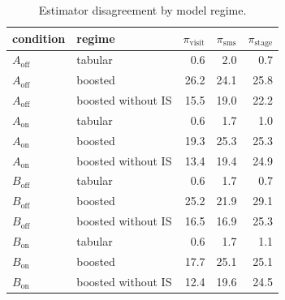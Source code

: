 \begin{table}[!htbp]
\centering
\caption{Estimator disagreement by model regime.}
\label{tab:campaignagreement}
\small
\begin{tabular}{llrrr}
\toprule
condition & regime & $\pi_{\mathrm{visit}}$ & $\pi_{\mathrm{sms}}$ & $\pi_{\mathrm{stage}}$ \\
\midrule
$A_{\mathrm{off}}$ & tabular & 0.6 & 2.0 & 0.7 \\
$A_{\mathrm{off}}$ & boosted & 26.2 & 24.1 & 25.8 \\
$A_{\mathrm{off}}$ & boosted without IS & 15.5 & 19.0 & 22.2 \\
$A_{\mathrm{on}}$ & tabular & 0.6 & 1.7 & 1.0 \\
$A_{\mathrm{on}}$ & boosted & 19.3 & 25.3 & 25.3 \\
$A_{\mathrm{on}}$ & boosted without IS & 13.4 & 19.4 & 24.9 \\
$B_{\mathrm{off}}$ & tabular & 0.6 & 1.7 & 0.7 \\
$B_{\mathrm{off}}$ & boosted & 25.2 & 21.9 & 29.1 \\
$B_{\mathrm{off}}$ & boosted without IS & 16.5 & 16.9 & 25.3 \\
$B_{\mathrm{on}}$ & tabular & 0.6 & 1.7 & 1.1 \\
$B_{\mathrm{on}}$ & boosted & 17.7 & 25.1 & 25.1 \\
$B_{\mathrm{on}}$ & boosted without IS & 12.4 & 19.6 & 24.5 \\
\bottomrule
\end{tabular}
\end{table}

